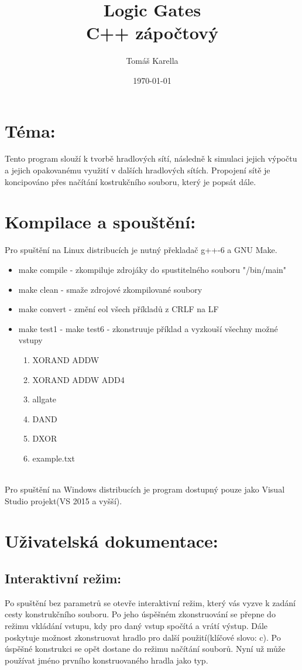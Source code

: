 \documentclass[12pt, oneside]{article}
\title{\vspace{-12ex}Logic Gates \\ C++ zápočtový }
\author{\vspace{-10ex}Tomáš Karella}
\date{\today}
\begin{document}
\maketitle
\section*{Téma:} Tento program slouží k tvorbě hradlových sítí, následně k simulaci jejich výpočtu a jejich opakovanému využití v dalších hradlových sítích. Propojení sítě je koncipováno přes načítání kostrukčního souboru, který je popsát dále.
\section*{Kompilace a spouštění:} Pro spuštění na Linux distribucích je nutný překladač g++-6 a GNU Make.  \\
\begin{itemize}
\item make compile -  zkompiluje zdrojáky do spustitelného souboru "/bin/main"
\item make clean - smaže zdrojové zkompilované soubory
\item make convert - změní eol všech příkladů z CRLF na LF
\item make test1 - make test6 - zkonstruuje příklad a vyzkouší všechny možné vstupy
\begin{enumerate}
\item XORAND ADDW 
\item XORAND ADDW ADD4
\item allgate 
\item DAND
\item DXOR
\item example.txt
\end{enumerate}  
\end{itemize}
 \ \\
Pro spuštění na Windows distribucích je program dostupný pouze jako Visual Studio projekt(VS 2015 a vyšší). \\ 
\section*{Uživatelská dokumentace:}
\subsection*{Interaktivní režim:}
Po spuštění bez parametrů se otevře interaktivní režim, který vás vyzve k zadání cesty konstrukčního souboru. Po jeho úspěšném zkonstruování se přepne do  režimu vkládání vstupu, kdy pro daný vstup spočítá a vrátí výstup. Dále poskytuje možnost zkonstruovat hradlo pro další použití(klíčové slovo: c).  Po úspěšné konstrukci se opět dostane do režimu načítání souborů. Nyní už může používat jméno prvního konstruovaného hradla jako typ. \\
\end{document}
